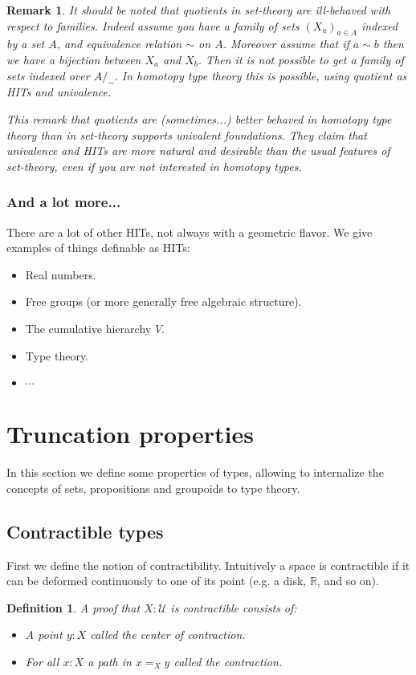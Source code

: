 \documentclass{article}
\newcommand{\se}[1]{\medbreak \medbreak \section{#1}}
\newcommand{\sse}[1]{\medbreak \subsection{#1}}
\newcommand{\ssse}[1]{\subsubsection*{#1}}
\newcommand{\U}{{\mathcal U}}
\newtheorem{definition}{Definition}
\newtheorem{remark}{Remark}
\begin{document}
\begin{remark}
It should be noted that quotients in set-theory are ill-behaved with respect to families. Indeed assume you have a family of sets $(X_a)_{a\in A}$ indexed by a set $A$, and equivalence relation $\sim$ on $A$. Moreover assume that if $a\sim b$ then we have a bijection between $X_a$ and $X_b$. Then it is not possible to get a family of sets indexed over $A/_\sim$. In homotopy type theory this is possible, using quotient as HITs and univalence.

This remark that quotients are (sometimes...) better behaved in homotopy type theory than in set-theory supports \emph{univalent foundations}. They claim that univalence and HITs are more natural and desirable than the usual features of set-theory, even if you are not interested in homotopy types. %
 \end{remark}


\ssse{And a lot more...}

There are a lot of other HITs, not always with a geometric flavor. We give examples of things definable as HITs:
\begin{itemize} 
\item Real numbers.
\item Free groups (or more generally free algebraic structure).
\item The cumulative hierarchy $V$.
\item Type theory.
\item $\cdots$
\end{itemize}




\se{Truncation properties}

In this section we define some properties of types, allowing to internalize the concepts of sets, propositions and groupoids to type theory.


\sse{Contractible types}

First we define the notion of contractibility. Intuitively a space is contractible if it can be deformed continuously to one of its point (e.g. a disk, $\mathbb{R}$, and so on). %

\begin{definition}
A proof that $X:\U$ is contractible consists of:
\begin{itemize}
\item A point $y:X$ called the \emph{center of contraction}.
\item For all $x:X$ a path in $x=_X y$ called the \emph{contraction}.
\end{itemize}
\end{definition}
\end{document}
